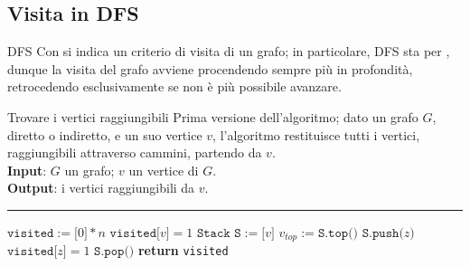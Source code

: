 \documentclass[a4paper, 12pt]{report}
\begin{document}
    \subsection{Visita in DFS}

    \begin{frameddefn}{DFS}
        Con  si indica un criterio di visita di un grafo; in particolare, DFS sta per , dunque la visita del grafo avviene procendendo sempre più in profondità, retrocedendo esclusivamente se non è più possibile avanzare.
    \end{frameddefn}

    \begin{framedalgo}{Trovare i vertici raggiungibili}
        Prima versione dell'algoritmo; dato un grafo $G$, diretto o indiretto, e un suo vertice $v$, l'algoritmo restituisce tutti i vertici, raggiungibili attraverso cammini, partendo da $v$.\\
        \textbf{Input}: $G$ un grafo; $v$ un vertice di $G$.\\
        \textbf{Output}: i vertici raggiungibili da $v$.

        \hrule
        \begin{algorithmic}[1]
                \State $\texttt{visited}:=\texttt{[}0\texttt{]} * n$ 
                \State $\texttt{visited[}v\texttt{]} = 1$
                \State $\texttt{Stack S}:=\texttt{[}v\texttt{]}$
                    \State $v_{top}:=\texttt{S.top()}$
                        \State $\texttt{S.push(}z\texttt{)}$
                        \State $\texttt{visited[}z\texttt{]} = 1$
                    \Else
                        \State $\texttt{S.pop()}$
                    \EndIf
                \EndWhile
                \State \textbf{return} \texttt{visited}
            \EndFunction
        \end{algorithmic}
    \end{framedalgo}
\end{document}

